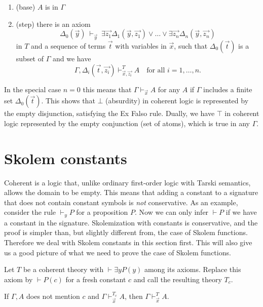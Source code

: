 \documentclass[10pt,a4paper]{article}
\begin{document}
\begin{enumerate}
\item (base) $A$ is in $\Gamma$ 

\item (step) there is an axiom 
$$
\Delta_0(\vec{y})~\vdash_{\vec{y}}~
\exists \vec{z_1}\Delta_1(\vec{y},\vec{z_1})\vee\dots\vee\exists \vec{z_n}\Delta_n(\vec{y},\vec{z_n})
$$
in $T$ and a sequence of terms $\vec{t}$ with variables in $\vec{x}$,
such that $\Delta_0(\vec{t})$ is a subset of $\Gamma$ and
we have 
$$
\Gamma,\Delta_i(\vec{t},\vec{z_i})\vdash^T_{\vec{x},\vec{z_i}} A
\quad \text{for all $i = 1,\dots,n$.}
$$
\end{enumerate}

In the special case $n=0$ this means that $\Gamma\vdash_{\vec{x}} A$ for any $A$ if $\Gamma$
includes a finite set $\Delta_0(\vec{t})$. This shows that $\bot$ (absurdity) in coherent logic
is represented by the empty disjunction, satisfying the Ex Falso rule. Dually, we have $\top$
in coherent logic represented by  the empty conjunction (set of atoms), 
which is true in any $\Gamma$.

\section{Skolem constants}\label{sec:skolemconstant}

Coherent is a logic that, unlike ordinary first-order logic with Tarski semantics,
allows the domain to be empty. This means that adding a constant to a signature
that does not contain constant symbols is \emph{not} conservative.
As an example, consider the rule $\vdash_{y} P$ for a proposition $P$.
Now we can only infer $\vdash P$ if we have a constant in the signature.
Skolemization with constants is conservative, and the proof is simpler than,
but slightly different from, the case of Skolem functions.
Therefore we deal with Skolem constants in this section first.
This will also give us a good picture of what we need to prove
the case of Skolem functions.

Let $T$ be a coherent theory with $\vdash\exists y P(y)$ among its axioms.
Replace this axiom by $\vdash P(c)$ for a fresh constant $c$
and call the resulting theory $T_c$. 

\begin{theorem}
If $\Gamma,A$ does not mention $c$ and $\Gamma\vdash_{\vec{x}}^{T_c} A$, then
$\Gamma\vdash_{\vec{x}}^{T} A$.
\end{theorem}
\end{document}
